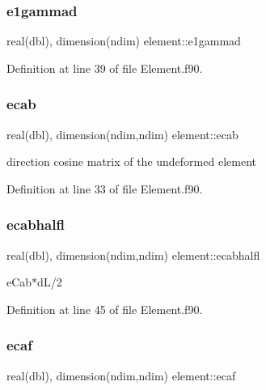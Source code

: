 \subsubsection{\texorpdfstring{e1gammad}{e1gammad}}
{\footnotesize\ttfamily real(dbl), dimension(ndim) element\+::e1gammad\hspace{0.3cm}{\ttfamily [private]}}



Definition at line 39 of file Element.\+f90.

\mbox{\label{namespaceelement_a235dfda3fd31cfbf932e5a7cba3d18ec}} 
\subsubsection{\texorpdfstring{ecab}{ecab}}
{\footnotesize\ttfamily real(dbl), dimension(ndim,ndim) element\+::ecab\hspace{0.3cm}{\ttfamily [private]}}



direction cosine matrix of the undeformed element 



Definition at line 33 of file Element.\+f90.

\mbox{\label{namespaceelement_af027b6db49efde36e310bc9e4f8e0d06}} 
\subsubsection{\texorpdfstring{ecabhalfl}{ecabhalfl}}
{\footnotesize\ttfamily real(dbl), dimension(ndim,ndim) element\+::ecabhalfl\hspace{0.3cm}{\ttfamily [private]}}



e\+Cab$\ast$d\+L/2 



Definition at line 45 of file Element.\+f90.

\mbox{\label{namespaceelement_a8cf9df9304438d7eaddcd8609c6968c5}} 
\subsubsection{\texorpdfstring{ecaf}{ecaf}}
{\footnotesize\ttfamily real(dbl), dimension(ndim,ndim) element\+::ecaf\hspace{0.3cm}{\ttfamily [private]}}



